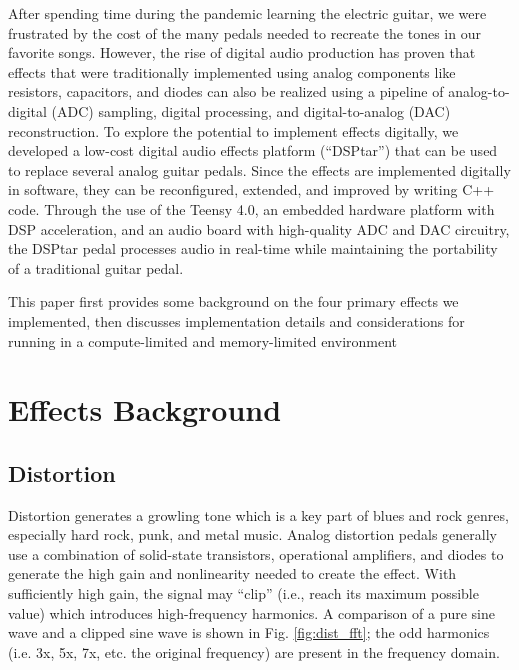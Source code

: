 \documentclass[conference]{IEEEtran}
\begin{document}
After spending time during the pandemic learning the electric guitar, we were frustrated by the cost of the many pedals needed to recreate the tones in our favorite songs. However, the rise of digital audio production has proven that effects that were traditionally implemented using analog components like resistors, capacitors, and diodes can also be realized using a pipeline of analog-to-digital (ADC) sampling, digital processing, and digital-to-analog (DAC) reconstruction. To explore the potential to implement effects digitally, we developed a low-cost digital audio effects platform (``DSPtar'') that can be used to replace several analog guitar pedals. Since the effects are implemented digitally in software, they can be reconfigured, extended, and improved by writing C++ code. Through the use of the Teensy 4.0, an embedded hardware platform with DSP acceleration, and an audio board with high-quality ADC and DAC circuitry, the DSPtar pedal processes audio in real-time while maintaining the portability of a traditional guitar pedal.

This paper first provides some background on the four primary effects we implemented, then discusses implementation details and considerations for running in a compute-limited and memory-limited environment


\section{Effects Background}

\subsection{Distortion}

Distortion generates a growling tone which is a key part of blues and rock genres, especially hard rock, punk, and metal music. Analog distortion pedals generally use a combination of solid-state transistors, operational amplifiers, and diodes to generate the high gain and nonlinearity needed to create the effect. With sufficiently high gain, the signal may ``clip'' (i.e., reach its maximum possible value) which introduces high-frequency harmonics. A comparison of a pure sine wave and a clipped sine wave is shown in Fig. \ref{fig:dist_fft}; the odd harmonics (i.e. 3x, 5x, 7x, etc. the original frequency) are present in the frequency domain. 
\end{document}

